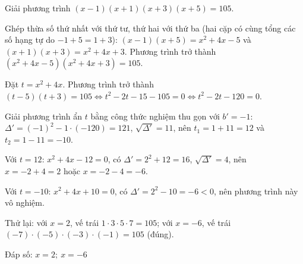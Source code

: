 \begin{problem}[9DS-PT2-019]
Giải phương trình $(x - 1)(x + 1)(x + 3)(x + 5) = 105$.

\begin{solution}
Ghép thừa số thứ nhất với thứ tư, thứ hai với thứ ba (hai cặp có cùng tổng các số hạng tự do $-1 + 5 = 1 + 3$): $(x - 1)(x + 5) = x^2 + 4x - 5$ và $(x + 1)(x + 3) = x^2 + 4x + 3$. Phương trình trở thành $(x^2 + 4x - 5)(x^2 + 4x + 3) = 105$.

Đặt $t = x^2 + 4x$. Phương trình trở thành $(t - 5)(t + 3) = 105 \Leftrightarrow t^2 - 2t - 15 - 105 = 0 \Leftrightarrow t^2 - 2t - 120 = 0$.

Giải phương trình ẩn $t$ bằng công thức nghiệm thu gọn với $b' = -1$: $\Delta' = (-1)^2 - 1 \cdot (-120) = 121$, $\sqrt{\Delta'} = 11$, nên $t_1 = 1 + 11 = 12$ và $t_2 = 1 - 11 = -10$.

Với $t = 12$: $x^2 + 4x - 12 = 0$, có $\Delta' = 2^2 + 12 = 16$, $\sqrt{\Delta'} = 4$, nên $x = -2 + 4 = 2$ hoặc $x = -2 - 4 = -6$.

Với $t = -10$: $x^2 + 4x + 10 = 0$, có $\Delta' = 2^2 - 10 = -6 < 0$, nên phương trình này vô nghiệm.

Thử lại: với $x = 2$, vế trái $1 \cdot 3 \cdot 5 \cdot 7 = 105$; với $x = -6$, vế trái $(-7) \cdot (-5) \cdot (-3) \cdot (-1) = 105$ (đúng).

Đáp số: $\boxed{x = 2;\ x = -6}$
\end{solution}
\end{problem}

